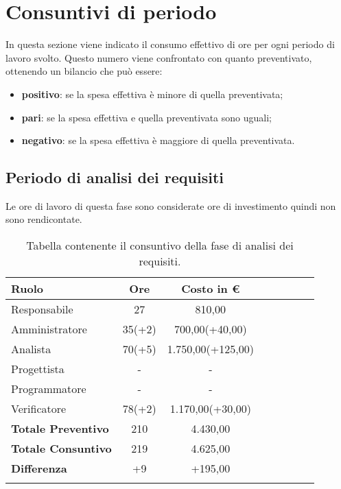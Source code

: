 \section{Consuntivi di periodo} \label{_consultivo}
In questa sezione viene indicato il consumo effettivo di ore per ogni periodo di lavoro svolto. Questo numero viene confrontato con quanto preventivato, ottenendo un bilancio che può essere:
\begin{itemize}
    \item \textbf{positivo}: se la spesa effettiva è minore di quella preventivata;
    \item \textbf{pari}: se la spesa effettiva e quella preventivata sono uguali;
    \item \textbf{negativo}:  se la spesa effettiva è maggiore di quella preventivata.
\end{itemize}

\subsection{Periodo di analisi dei requisiti} \label{_consultivoAnalisiDeiRequisiti}
Le ore di lavoro di questa fase sono considerate ore di investimento quindi non sono rendicontate.
            				
			\begin{longtable}{|l|c|c|c|c|c|c|c|}
				\hline
				\rowcolor{lighter-grayer}
				\textbf{Ruolo} & \textbf{Ore} & \textbf{Costo in €} \\
				\hline
				\endfirsthead
				
				\hline
				Responsabile & 27 & 810,00\\
				\hline
				\hline
				Amministratore & 35(+2) & 700,00(+40,00)\\
				\hline
				\hline
				Analista & 70(+5) & 1.750,00(+125,00)\\
				\hline
				\hline
				Progettista & - & -\\
				\hline
				\hline
				Programmatore & - & -\\
				\hline
				\hline
				Verificatore & 78(+2) & 1.170,00(+30,00)\\
				\hline
                \textbf{Totale Preventivo} & 210 & 4.430,00\\
                \hline
				\hline
                \textbf{Totale Consuntivo} & 219 & 4.625,00\\
                \hline
                \hline
                \textbf{Differenza} & +9 & +195,00\\
				\hline
				\caption{Tabella contenente il consuntivo della fase di analisi dei requisiti.}
			\end{longtable}
